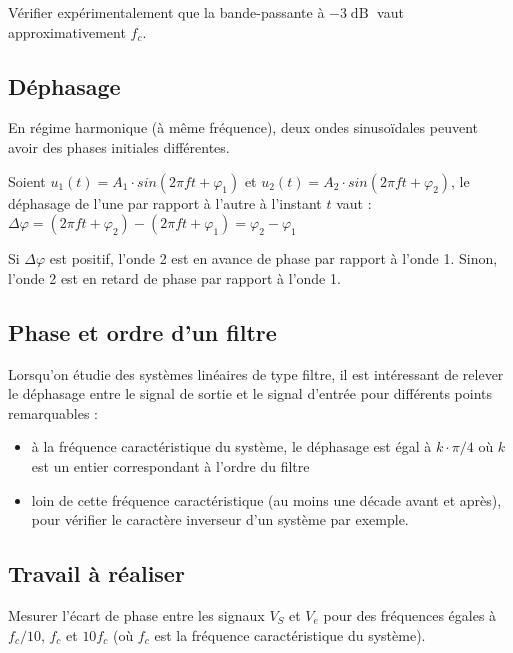 \Manip Vérifier expérimentalement que la bande-passante à $-3\operatorname{dB}$ vaut approximativement $f_c$.


\subsection{Déphasage}

En régime harmonique (à même fréquence), deux ondes sinusoïdales peuvent avoir des phases initiales différentes.

Soient $u_1(t) = A_1 \cdot sin(2\pi f t + \varphi_1)$ et $u_2(t) = A_2 \cdot sin(2\pi f t + \varphi_2)$, le déphasage de l'une par rapport à l'autre à l'instant $t$ vaut : $\Delta\varphi = (2\pi f t + \varphi_2) - (2\pi f t + \varphi_1) = \varphi_2 - \varphi_1$

\medskip

Si $\Delta\varphi$ est positif, l'onde 2 est en avance de phase par rapport à l'onde 1. Sinon, l'onde 2 est en retard de phase par rapport à l'onde 1.

\subsection{Phase et ordre d'un filtre}

Lorsqu'on étudie des systèmes linéaires de type filtre, il est intéressant de relever le déphasage entre le signal de sortie et le signal d'entrée pour différents points remarquables :

\begin{itemize}
	\item à la fréquence caractéristique du système, le déphasage est égal à $k\cdot \pi/4$ où $k$ est un entier correspondant à l'ordre du filtre
	\item loin de cette fréquence caractéristique (au moins une décade avant et après), pour vérifier le caractère inverseur d'un système par exemple.
\end{itemize}


\subsection{Travail à réaliser}

\Manip Mesurer l'écart de phase entre les signaux $V_S$ et $V_e$ pour des fréquences égales à $f_c / 10$, $f_c$ et $10 f_c$ (où $f_c$ est la fréquence caractéristique du système).

